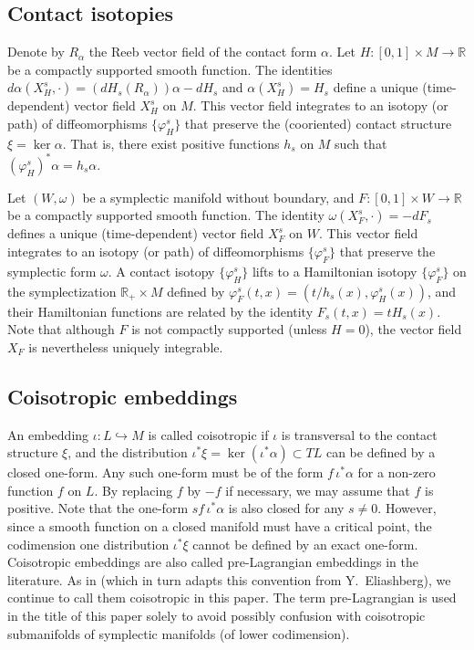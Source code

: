 \documentclass{amsart}
\theoremstyle{remark}
\def\R{{\mathbb R}}
\begin{document}
\subsection{Contact isotopies}
Denote by $R_\alpha$ the Reeb vector field of the contact form $\alpha$.
Let $H \colon [0, 1] \times M \to \R$ be a compactly supported smooth function.
The identities $d\alpha (X_H^s, \cdot) = (dH_s (R_\alpha)) \alpha - dH_s$ and $\alpha (X_H^s) = H_s$ define a unique (time-dependent) vector field $X_H^s$ on $M$.
This vector field integrates to an isotopy (or path) of diffeomorphisms $\{ \varphi_H^s \}$ that preserve the (cooriented) contact structure $\xi = \ker \alpha$.
That is, there exist positive functions $h_s$ on $M$ such that $(\varphi_H^s)^* \alpha = h_s \alpha$.

Let $(W, \omega)$ be a symplectic manifold without boundary, and $F \colon [0, 1] \times W \to \R$ be a compactly supported smooth function.
The identity $\omega (X_F^s, \cdot) = - dF_s$ defines a unique (time-dependent) vector field $X_F^s$ on $W$.
This vector field integrates to an isotopy (or path) of diffeomorphisms $\{ \varphi_F^s \}$ that preserve the symplectic form $\omega$.
A contact isotopy $\{ \varphi_H^s \}$ lifts to a Hamiltonian isotopy $\{ \varphi_F^s \}$ on the symplectization $\R_+ \times M$ defined by $\varphi_F^s (t, x) = (t / h_s (x), \varphi_H^s (x))$, and their Hamiltonian functions are related by the identity $F_s (t, x) = t H_s (x)$.
Note that although $F$ is not compactly supported (unless $H = 0$), the vector field $X_F$ is nevertheless uniquely integrable.

\subsection{Coisotropic embeddings} \label{subsec:coisotropic}
An embedding $\iota \colon L \hookrightarrow M$ is called coisotropic if $\iota$ is transversal to the contact structure $\xi$, and the distribution $\iota^* \xi = \ker (\iota^* \alpha) \subset TL$ can be defined by a closed one-form.
Any such one-form must be of the form $f \, \iota^* \alpha$ for a non-zero function $f$ on $L$.
By replacing $f$ by $- f$ if necessary, we may assume that $f$ is positive.
Note that the one-form $s f \, \iota^* \alpha$ is also closed for any $s \not= 0$.
However, since a smooth function on a closed manifold must have a critical point, the codimension one distribution $\iota^* \xi$ cannot be defined by an exact one-form.
Coisotropic embeddings are also called pre-Lagrangian embeddings in the literature.
As in \cite{mueller:csc16} (which in turn adapts this convention from Y.~Eliashberg), we continue to call them coisotropic in this paper.
The term pre-Lagrangian is used in the title of this paper solely to avoid possibly confusion with coisotropic submanifolds of symplectic manifolds (of lower codimension).
\end{document}
